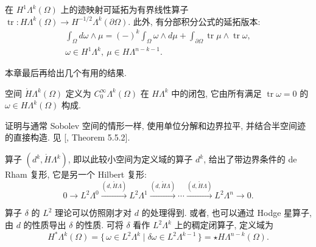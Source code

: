 
\begin{Theorem}\label{thm:forms-weak-trace-extension}
{在 $H^1\Lambda^k(\Omega)$ 上的迹映射可延拓为有界线性算子 $\operatorname{tr}:H\Lambda^k(\Omega)\to H^{-1/2}\Lambda^k(\partial\Omega)$. 此外, 有分部积分公式的延拓版本:}
\begin{equation}\label{eq:forms-extended-integration-by-parts}
\begin{gathered}
\int_\Omega d\omega\wedge\mu=(-)^k\int_\Omega\omega\wedge d\mu+\int_{\partial\Omega}\operatorname{tr}\mu\wedge\operatorname{tr}\omega,\\
\omega\in H^1\Lambda^k,\ \mu\in H\Lambda^{n-k-1}.
\end{gathered}
\end{equation}
\end{Theorem}

{本章最后再给出几个有用的结果.}


\begin{Theorem}\label{thm:forms-zero-trace-characterization}
{空间 $\mathring H\Lambda^k(\Omega)$ 定义为 $C_0^\infty\Lambda^k(\Omega)$ 在 $H\Lambda^k$ 中的闭包, 它由所有满足 $\operatorname{tr}\omega=0$ 的 $\omega\in H\Lambda^k(\Omega)$ 构成.}
\end{Theorem}

\begin{Proof}
{证明与通常 Sobolev 空间的情形一样, 使用单位分解和边界拉平, 并结合半空间迹的直接构造. 见 [, Theorem 5.5.2].}
\end{Proof}

{算子 $(d^k,\mathring H\Lambda^k)$, 即以此较小空间为定义域的算子 $d^k$, 给出了带边界条件的 de Rham 复形, 它是另一个 Hilbert 复形:}
\begin{equation}\label{eq:boundary-manifold-de-rham-complex}
0\to L^2\Lambda^0\xrightarrow{(d,\mathring H\Lambda)}L^2\Lambda^1\xrightarrow{(d,\mathring H\Lambda)}\cdots\xrightarrow{(d,\mathring H\Lambda)}L^2\Lambda^n\to0.
\end{equation}

{算子 $\delta$ 的 $L^2$ 理论可以仿照刚才对 $d$ 的处理得到. 或者, 也可以通过 Hodge 星算子, 由 $d$ 的性质导出 $\delta$ 的性质. 可将 $\delta$ 看作 $L^2\Lambda^k$ 上的稠定闭算子, 定义域为}
\[
H^*\Lambda^k(\Omega)=\{\,\omega\in L^2\Lambda^k\mid\delta\omega\in L^2\Lambda^{k-1}\,\}=\star H\Lambda^{n-k}(\Omega).
\]

